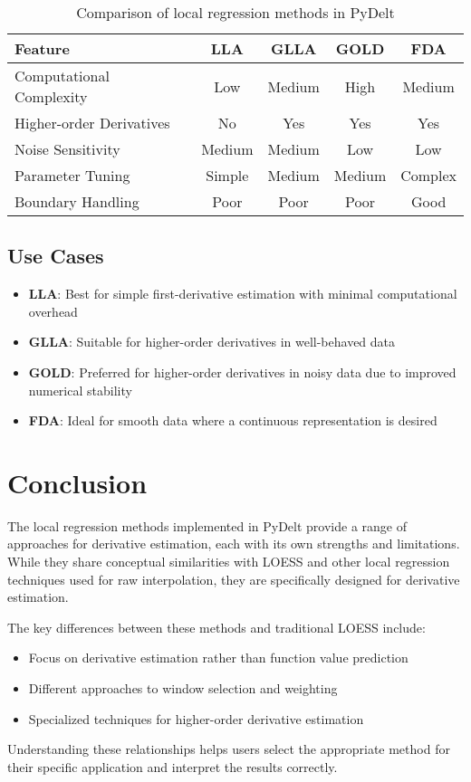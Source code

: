 \documentclass{article}
\begin{document}
\begin{table}[h]
\centering
\begin{tabular}{lcccc}
\toprule
\textbf{Feature} & \textbf{LLA} & \textbf{GLLA} & \textbf{GOLD} & \textbf{FDA} \\
\midrule
Computational Complexity & Low & Medium & High & Medium \\
Higher-order Derivatives & No & Yes & Yes & Yes \\
Noise Sensitivity & Medium & Medium & Low & Low \\
Parameter Tuning & Simple & Medium & Medium & Complex \\
Boundary Handling & Poor & Poor & Poor & Good \\
\bottomrule
\end{tabular}
\caption{Comparison of local regression methods in PyDelt}
\end{table}

\subsection{Use Cases}

\begin{itemize}
    \item \textbf{LLA}: Best for simple first-derivative estimation with minimal computational overhead
    \item \textbf{GLLA}: Suitable for higher-order derivatives in well-behaved data
    \item \textbf{GOLD}: Preferred for higher-order derivatives in noisy data due to improved numerical stability
    \item \textbf{FDA}: Ideal for smooth data where a continuous representation is desired
\end{itemize}

\section{Conclusion}

The local regression methods implemented in PyDelt provide a range of approaches for derivative estimation, each with its own strengths and limitations. While they share conceptual similarities with LOESS and other local regression techniques used for raw interpolation, they are specifically designed for derivative estimation.

The key differences between these methods and traditional LOESS include:
\begin{itemize}
    \item Focus on derivative estimation rather than function value prediction
    \item Different approaches to window selection and weighting
    \item Specialized techniques for higher-order derivative estimation
\end{itemize}

Understanding these relationships helps users select the appropriate method for their specific application and interpret the results correctly.
\end{document}
